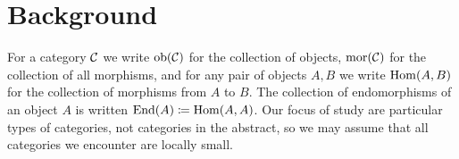 \chapter{Background}

For a category $\mathcal{C}$ we write $\operatorname{ob}(\mathcal{C})$ for the collection of objects, $\operatorname{mor}(\mathcal{C})$ for the collection of all morphisms, and for any pair of objects $A,B$ we write $\operatorname{Hom}(A,B)$ for the collection of morphisms from $A$ to $B$. The collection of endomorphisms of an object $A$ is written $\operatorname{End}(A) \coloneqq \operatorname{Hom}(A,A)$. Our focus of study are particular types of categories, not categories in the abstract, so we may assume that all categories we encounter are locally small. %










